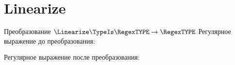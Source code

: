 \section{Linearize}
\begin{frame}{Преобразование $\Linearize\TypeIs\RegexTYPE\to\RegexTYPE$}
	Регулярное выражение до преобразования:

	Регулярное выражение после преобразования:

\end{frame}
